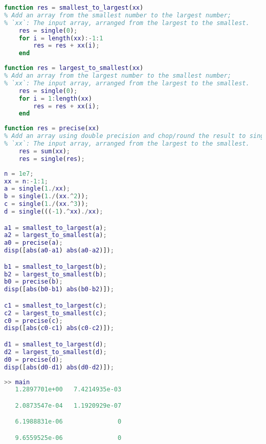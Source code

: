 \begin{lstlisting}[language = MATLAB]
function res = smallest_to_largest(xx)
% Add an array from the smallest number to the largest number;
% `xx`: The input array, arranged from the largest to the smallest.
    res = single(0);
    for i = length(xx):-1:1
        res = res + xx(i);
    end
\end{lstlisting}
\begin{lstlisting}[language = MATLAB]
function res = largest_to_smallest(xx)
% Add an array from the largest number to the smallest number;
% `xx`: The input array, arranged from the largest to the smallest.
    res = single(0);
    for i = 1:length(xx)
        res = res + xx(i);
    end
\end{lstlisting}
\begin{lstlisting}[language = MATLAB]
function res = precise(xx)
% Add an array using double precision and chop/round the result to single precision;
% `xx`: The input array, arranged from the largest to the smallest.
    res = sum(xx);
    res = single(res);
\end{lstlisting}
\begin{lstlisting}[language = MATLAB]
% Main Script
n = 1e7;
xx = n:-1:1;
a = single(1./xx);
b = single(1./(xx.^2));
c = single(1./(xx.^3));
d = single(((-1).^xx)./xx);

a1 = smallest_to_largest(a);
a2 = largest_to_smallest(a);
a0 = precise(a);
disp([abs(a0-a1) abs(a0-a2)]);

b1 = smallest_to_largest(b);
b2 = largest_to_smallest(b);
b0 = precise(b);
disp([abs(b0-b1) abs(b0-b2)]);

c1 = smallest_to_largest(c);
c2 = largest_to_smallest(c);
c0 = precise(c);
disp([abs(c0-c1) abs(c0-c2)]);

d1 = smallest_to_largest(d);
d2 = largest_to_smallest(d);
d0 = precise(d);
disp([abs(d0-d1) abs(d0-d2)]);
\end{lstlisting}
\begin{lstlisting}[language = MATLAB]
>> main
   1.2897701e+00   7.4214935e-03

   2.0873547e-04   1.1920929e-07

   6.1988831e-06               0

   9.6559525e-06               0
\end{lstlisting}

